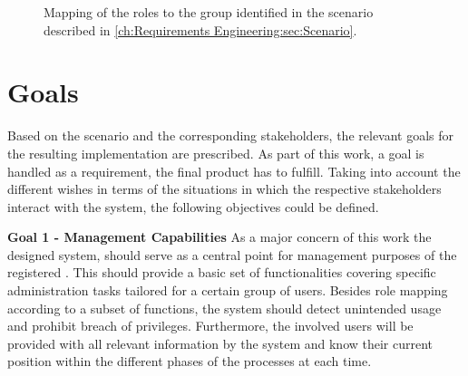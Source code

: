 \begin{figure}[h]
    \centering
    \caption{Mapping of the roles to the group identified in the scenario described in \ref{ch:Requirements Engineering:sec:Scenario}.}
    \label{fig:role-mapping}
\end{figure}



\newpage

\section{Goals}
\label{ch:Requirements Engineering:sec:Goals}

Based on the scenario and the corresponding stakeholders, the relevant goals for the resulting implementation are prescribed. As part of this work, a goal is handled as a requirement, the final product has to fulfill. 
Taking into account the different wishes in terms of the situations in which the respective stakeholders interact with the system, the following objectives could be defined.

\noindent \textbf{Goal 1 - Management Capabilities} As a major concern of this work the designed system, should serve as a central point for management purposes of the registered . This should provide a basic set of functionalities covering specific administration tasks tailored for a certain group of users. 
Besides role mapping according to a subset of functions, the system should detect unintended usage and prohibit breach of privileges.
Furthermore, the involved users will be provided with all relevant information by the system and know their current position within the different phases of the processes at each time. 

